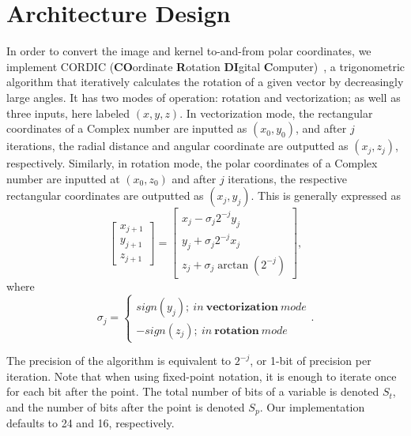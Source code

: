 \documentclass[
  10pt,
  \FORMAT-MODE,
  \REVIEW-MODE,
  \TWOSIDE-MODE
]{IEEEtran}
\begin{document}
\section{Architecture Design}\label{sec:arch}
  In order to convert the image and kernel to-and-from polar coordinates, we implement CORDIC ({\bf{CO}}ordinate {\bf{R}}otation {\bf{DI}}gital {\bf{C}}omputer)~\cite{volder1959cordic}, a trigonometric algorithm that iteratively calculates the rotation of a given vector by decreasingly large angles. It has two modes of operation: rotation and vectorization; as well as three inputs, here labeled $(x,y,z)$. In vectorization mode, the rectangular coordinates of a Complex number are inputted as $(x_0,y_0)$, and after $j$ iterations, the radial distance and angular coordinate are outputted as $(x_j,z_j)$, respectively. Similarly, in rotation mode, the polar coordinates of a Complex number are inputted at $(x_0,z_0)$ and after $j$ iterations, the respective rectangular coordinates are outputted as $(x_j,y_j)$. This is generally expressed as
  \begin{equation}\label{eq:cordic1}
    \begin{bmatrix}
      x_{j+1} \\
      y_{j+1} \\
      z_{j+1}
    \end{bmatrix}
    =
    \begin{bmatrix}
      x_{j} - \sigma_{j}2^{-j}y_{j} \\
      y_{j} + \sigma_{j}2^{-j}x_{j} \\
      z_{j} + \sigma_{j}\arctan(2^{-j})
    \end{bmatrix},
  \end{equation}
  where
  \begin{equation}\label{eq:cordic2}
    \sigma_j = 
    \begin{cases}
      sign(y_j);~in~\textbf{vectorization}~mode \\
      -sign(z_j);~in~\textbf{rotation}~mode
    \end{cases}.
  \end{equation}

  The precision of the algorithm is equivalent to $2^{-j}$, or 1-bit of precision per iteration. Note that when using fixed-point notation, it is enough to iterate once for each bit after the point. The total number of bits of a variable is denoted $S_t$, and the number of bits after the point is denoted $S_p$. Our implementation defaults to 24 and 16, respectively.
\end{document}
